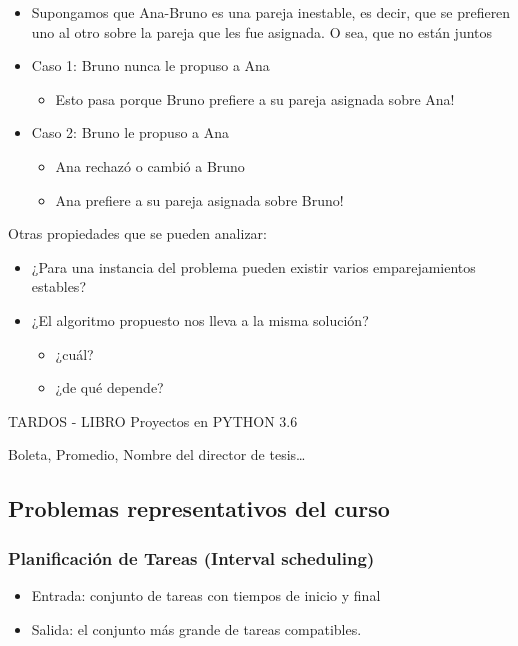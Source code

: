 \documentclass[letterpaper, 12pt]{article}
\begin{document}
\begin{itemize}
\begin{itemize}
\begin{itemize}
\item Supongamos que Ana-Bruno es una pareja inestable, es decir, que se
prefieren uno al otro sobre la pareja que les fue asignada. O sea, que no
están juntos
\item Caso 1: Bruno nunca le propuso a Ana
\begin{itemize}
\item Esto pasa porque Bruno prefiere a su pareja asignada sobre Ana!
\end{itemize}
\item Caso 2: Bruno le propuso a Ana
\begin{itemize}
\item Ana rechazó o cambió a Bruno
\item Ana prefiere a su pareja asignada sobre Bruno!
\end{itemize}
\end{itemize}
\end{itemize}
\end{itemize}

Otras propiedades que se pueden analizar:
\begin{itemize}
\item ¿Para una instancia del problema pueden existir varios emparejamientos
estables?
\item ¿El algoritmo propuesto nos lleva a la misma solución?
\begin{itemize}
\item ¿cuál?
\item ¿de qué depende?
\end{itemize}
\end{itemize}

TARDOS - LIBRO
Proyectos en PYTHON 3.6

Boleta, Promedio, Nombre del director de tesis\ldots{}
\subsection{Problemas representativos del curso}
\label{sec:org7816927}
\subsubsection{Planificación de Tareas (Interval scheduling)}
\label{sec:org8450695}
\begin{itemize}
\item Entrada: conjunto de tareas con tiempos de inicio y final
\item Salida: el conjunto más grande de tareas compatibles.
\end{itemize}
\end{document}
